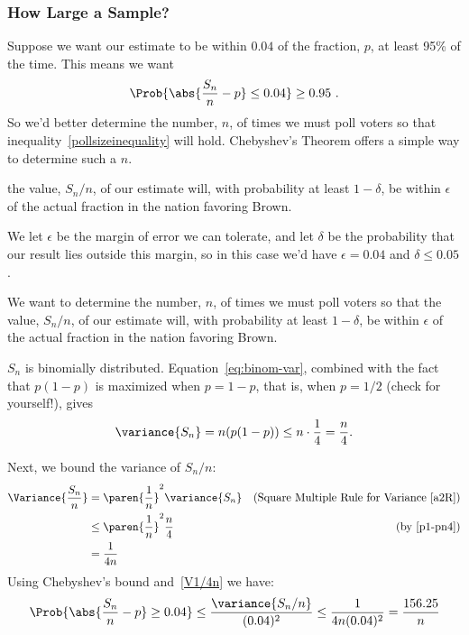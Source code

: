 \subsubsection{How Large a Sample?}
Suppose we want our estimate to be within $0.04$ of the fraction, $p$,
at least 95\% of the time.  This means we want
\begin{equation}\label{pollsizeinequality}
\Prob{\abs{\frac{S_n}{n} - p} \leq 0.04} \geq 0.95\ .
\end{equation}
So we'd better determine the number, $n$, of times we must poll voters so
that inequality~\eqref{pollsizeinequality} will hold.  Chebyshev's
Theorem offers a simple way to determine such a $n$.

\begin{editingnotes}
the value, $S_n/n$, of our estimate will, with probability at least
$1 -\delta$, be within $\epsilon$ of the actual fraction in the nation
favoring Brown.

We let $\epsilon$ be the margin of error we can tolerate, and let $\delta$
be the probability that our result lies outside this margin, so in this
case we'd have $\epsilon = 0.04$ and $\delta \le 0.05$.

We want to determine the number, $n$, of times we must poll voters so that
the value, $S_n/n$, of our estimate will, with probability at least
$1 -\delta$, be within $\epsilon$ of the actual fraction in the nation
favoring Brown.
\end{editingnotes}

$S_n$ is binomially distributed.  Equation~\eqref{eq:binom-var},
combined with the fact that $p(1-p)$ is maximized when $p = 1-p$, that
is, when $p=1/2$ (check for yourself!), gives
\begin{equation}\label{p1-pn4}
\variance{S_n}  = n(p(1-p)) \leq n \cdot \frac{1}{4} = \frac{n}{4}.
\end{equation}

Next, we bound the variance of $S_n/n$:
\begin{align}
\Variance{\frac{S_n}{n}}
       & = \paren{\frac{1}{n}}^2 \variance{S_n}
                     & \text{(Square Multiple Rule for Variance~\eqref{a2R})}\notag\\
       & \leq \paren{\frac{1}{n}}^2 \frac{n}{4} & \text{(by~\eqref{p1-pn4})}\notag\\
       & = \frac{1}{4n}\label{V1/4n}
\end{align}
Using Chebyshev's bound and~\eqref{V1/4n} we have:
\begin{equation}\label{CK}
\Prob{\abs{\frac{S_n}{n} - p} \geq 0.04}
    \leq \frac{\variance{S_n/n}}{(0.04)^2}
       \leq \frac{1}{4n(0.04)^2} = \frac{156.25}{n}
\end{equation}

